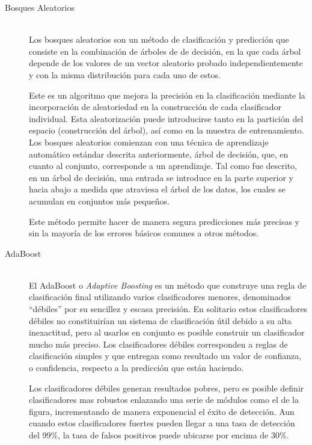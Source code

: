 \begin{enumerate}
\begin{description}
      \item[Bosques Aleatorios] \hfill \\
      Los bosques aleatorios son un método de clasificación y predicción que consiste en la combinación de árboles de de decisión, en la que cada árbol depende de los valores de un vector aleatorio probado independientemente y con la misma distribución para cada uno de estos.
      
      Este es un algoritmo que mejora la precisión en la clasificación mediante la incorporación de aleatoriedad en la construcción de cada clasificador individual. Esta aleatorización puede introducirse tanto en la partición del espacio (construcción del árbol), así como en la muestra de entrenamiento. Los bosques aleatorios comienzan con una técnica de aprendizaje automático estándar descrita anteriormente, árbol de decisión, que, en cuanto al conjunto, corresponde a un aprendizaje. Tal como fue descrito, en un árbol de decisión, una entrada se introduce en la parte superior y hacia abajo a medida que atraviesa el árbol de los datos, los cuales se acumulan en conjuntos más pequeños.
      
      Este método permite hacer de manera segura predicciones más precisas y sin la mayoría de los errores básicos comunes a otros métodos.
      
      \item[AdaBoost] \hfill \\
      El AdaBoost o \textit{Adaptive Boosting} es un método que construye una regla de clasificación final utilizando varios clasificadores menores, denominados “débiles” por su sencillez y escasa precisión. En solitario estos clasificadores débiles no constituirían un sistema de clasificación útil debido a su alta inexactitud, pero al usarlos en conjunto es posible construir un clasificador mucho más preciso. Los clasificadores débiles corresponden a reglas de clasificación simples y que entregan como resultado un valor de confianza, o confidencia, respecto a la predicción que están haciendo.
      
      Los clasificadores débiles  generan resultados pobres, pero es posible  definir clasificadores mas robustos enlazando una serie de módulos como el de la figura,  incrementando de manera exponencial el éxito de detección. Aun cuando estos clasificadores fuertes  pueden llegar a una tasa de detección del 99\%, la tasa de falsos positivos puede ubicarse por encima de 30\%.
      

\end{description}
\end{enumerate}
